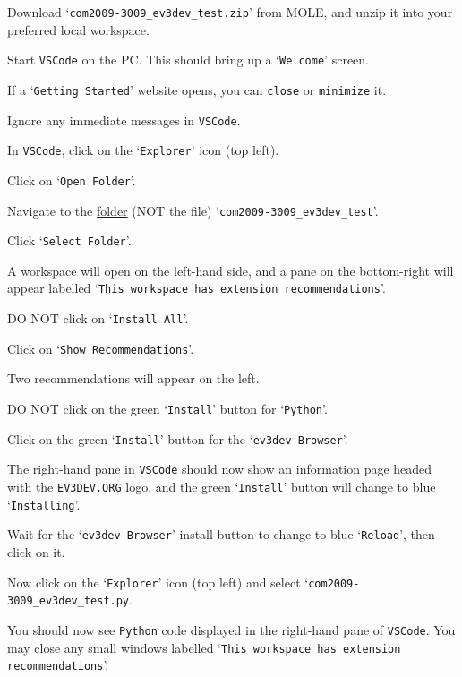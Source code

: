 \documentclass[hidelinks,a4paper,11pt]{article}
\begin{document}
\begin{todolist}
	\item Download `\texttt{com2009-3009\_ev3dev\_test.zip}' from MOLE, and unzip it into your preferred local workspace.
	\item Start \texttt{VSCode} on the PC.  This should bring up a `\texttt{Welcome}' screen.
	\item If a `\texttt{Getting Started}' website opens, you can \texttt{close} or \texttt{minimize} it.
	\item Ignore any immediate messages in \texttt{VSCode}.
	\item In \texttt{VSCode}, click on the `\texttt{Explorer}' icon (top left).
	\item Click on `\texttt{Open Folder}'.
	\item Navigate to the \underline{folder} (NOT the file) `\texttt{com2009-3009\_ev3dev\_test}'.
	\item Click `\texttt{Select Folder}'.
	\item A workspace will open on the left-hand side, and a pane on the bottom-right will appear labelled `\texttt{This workspace has extension recommendations}'.
	\item {\color {red} DO NOT} click on `\texttt{Install All}'.
	\item Click on `\texttt{Show Recommendations}'.
	\item Two recommendations will appear on the left.
	\item {\color {red} DO NOT} click on the green `\texttt{Install}' button for `\texttt{Python}'.
	\item Click on the green `\texttt{Install}' button for the `\texttt{ev3dev-Browser}'.
	\item The right-hand pane in \texttt{VSCode} should now show an information page headed with the \texttt{EV3DEV.ORG} logo, and the green `\texttt{Install}' button will change to blue `\texttt{Installing}'.
	\item Wait for the `\texttt{ev3dev-Browser}' install button to change to blue `\texttt{Reload}', then click on it.
	\item Now click on the `\texttt{Explorer}' icon (top left) and select `\texttt{com2009-3009\_ev3dev\_test.py}.
\end{todolist}

You should now see \texttt{Python} code displayed in the right-hand pane of \texttt{VSCode}.  You may close any small windows labelled `\texttt{This workspace has extension recommendations}'.
\end{document}
